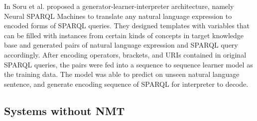 In \cite{Soru2018a,Soru2018} Soru et al. proposed a generator-learner-interpreter architecture, namely Neural SPARQL Machines to translate any natural language expression to encoded forms of SPARQL queries. They designed templates with variables that can be filled with instances from certain kinds of concepts in target knowledge base and generated pairs of natural language expression and SPARQL query accordingly. After encoding operators, brackets, and URIs contained in original SPARQL queries, the pairs were fed into a sequence to sequence learner model as the training data. The model was able to predict on unseen natural language sentence, and generate encoding sequence of SPARQL for interpreter to decode. 

\subsection{Systems without NMT}